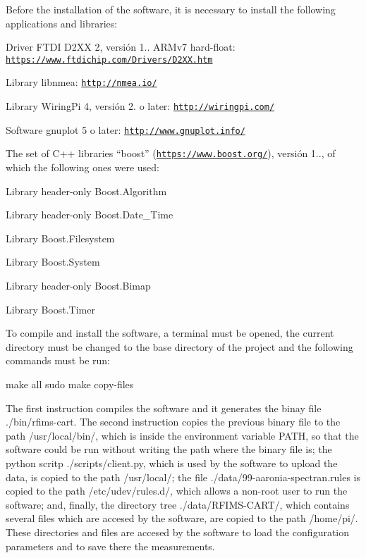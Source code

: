 Before the installation of the software, it is necessary to install the following applications and libraries\+:


\begin{DoxyItemize}
\item Driver F\+T\+DI D2\+XX 2, versión 1.. A\+R\+Mv7 hard-\/float\+: \href{https://www.ftdichip.com/Drivers/D2XX.htm}{\tt https\+://www.\+ftdichip.\+com/\+Drivers/\+D2\+X\+X.\+htm}
\item Library libnmea\+: \href{http://nmea.io/}{\tt http\+://nmea.\+io/}
\item Library Wiring\+Pi 4, versión 2. o later\+: \href{http://wiringpi.com/}{\tt http\+://wiringpi.\+com/}
\item Software gnuplot 5 o later\+: \href{http://www.gnuplot.info/}{\tt http\+://www.\+gnuplot.\+info/}
\item The set of C++ libraries “boost” (\href{https://www.boost.org/}{\tt https\+://www.\+boost.\+org/}), versión 1.., of which the following ones were used\+:
\begin{DoxyItemize}
\item Library header-\/only Boost.\+Algorithm
\item Library header-\/only Boost.\+Date\+\_\+\+Time
\item Library Boost.\+Filesystem
\item Library Boost.\+System
\item Library header-\/only Boost.\+Bimap
\item Library Boost.\+Timer
\end{DoxyItemize}
\end{DoxyItemize}

To compile and install the software, a terminal must be opened, the current directory must be changed to the base directory of the project and the following commands must be run\+: \begin{DoxyVerb}make all
sudo make copy-files
\end{DoxyVerb}


The first instruction compiles the software and it generates the binay file ./bin/rfims-\/cart. The second instruction copies the previous binary file to the path /usr/local/bin/, which is inside the environment variable P\+A\+TH, so that the software could be run without writing the path where the binary file is; the python scritp ./scripts/client.py, which is used by the software to upload the data, is copied to the path /usr/local/; the file ./data/99-\/aaronia-\/spectran.rules is copied to the path /etc/udev/rules.d/, which allows a non-\/root user to run the software; and, finally, the directory tree ./data/\+R\+F\+I\+M\+S-\/\+C\+A\+R\+T/, which contains several files which are accesed by the software, are copied to the path /home/pi/. These directories and files are accesed by the software to load the configuration parameters and to save there the measurements.

